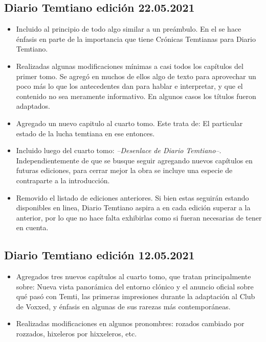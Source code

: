 \documentclass[
]{book}
\begin{document}
\hypertarget{diario-temtiano-ediciuxf3n-22.05.2021}{%
\subsection*{Diario Temtiano edición 22.05.2021}\label{diario-temtiano-ediciuxf3n-22.05.2021}}

\begin{itemize}
\item[$\boxtimes$]
  Incluido al principio de todo algo similar a un preámbulo. En el se hace énfasis en parte de la importancia que tiene Crónicas Temtianas para Diario Temtiano.
\item[$\boxtimes$]
  Realizadas algunas modificaciones mínimas a casi todos los capítulos del primer tomo. Se agregó en muchos de ellos algo de texto para aprovechar un poco más lo que los antecedentes dan para hablar e interpretar, y que el contenido no sea meramente informativo. En algunos casos los títulos fueron adaptados.
\item[$\boxtimes$]
  Agregado un nuevo capitulo al cuarto tomo. Este trata de: El particular estado de la lucha temtiana en ese entonces.
\item[$\boxtimes$]
  Incluido luego del cuarto tomo: \emph{--Desenlace de Diario Temtiano--}. Independientemente de que se busque seguir agregando nuevos capítulos en futuras ediciones, para cerrar mejor la obra se incluye una especie de contraparte a la introducción.
\item[$\boxtimes$]
  Removido el listado de ediciones anteriores. Si bien estas seguirán estando disponibles en linea, Diario Temtiano aspira a en cada edición superar a la anterior, por lo que no hace falta exhibirlas como si fueran necesarias de tener en cuenta.
\end{itemize}

\hypertarget{diario-temtiano-ediciuxf3n-12.05.2021}{%
\subsection*{Diario Temtiano edición 12.05.2021}\label{diario-temtiano-ediciuxf3n-12.05.2021}}

\begin{itemize}
\item[$\boxtimes$]
  Agregados tres nuevos capítulos al cuarto tomo, que tratan principalmente sobre: Nueva vista panorámica del entorno clónico y el anuncio oficial sobre qué pasó con Temti, las primeras impresiones durante la adaptación al Club de Voxxed, y énfasis en algunas de sus rarezas más contemporáneas.
\item[$\boxtimes$]
  Realizadas modificaciones en algunos pronombres: rozados cambiado por rozzados, hixeleros por hixxeleros, etc.
\end{itemize}
\end{document}
